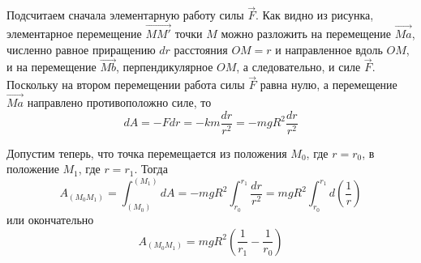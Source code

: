 Подсчитаем сначала элементарную работу силы \( \vec{F} \). Как видно из 
рисунка, элементарное перемещение \( \vec{MM'} \) точки \( M \) можно 
разложить на перемещение \( \vec{Ma} \), численно равное приращению 
\( dr \) расстояния \( OM = r \) и направленное вдоль \( OM \), и на 
перемещение \( \Vec{Mb} \), перпендикулярное \( OM \), а следовательно, и 
силе \( \vec{F} \). Поскольку на втором перемещении работа силы 
\( \vec{F} \) равна нулю, а перемещение \( \vec{Ma} \) направлено 
противоположно силе, то 
\[ dA = -Fdr = -km\frac{dr}{r^2} = -mgR^2 \frac{dr}{r^2} \]

Допустим теперь, что точка перемещается из положения \( M_0 \), где 
\( r = r_0 \), в положение \( M_1 \), где \( r = r_1 \). Тогда 
\[ 
    A_{(M_0 M_1)} = \int_{(M_0)}^{(M_1)} dA = 
    -mgR^2 \int_{r_0}^{r_1} \frac{dr}{r^2} =
    mgR^2 \int_{r_0}^{r_1} d\left( \frac{1}{r} \right)
\]
или окончательно
\[ A_{(M_0 M_1)} = mgR^2 \left( \frac{1}{r_1} - \frac{1}{r_0} \right) \]

\newpage
